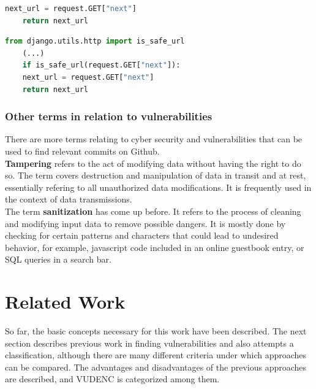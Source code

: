 \documentclass[
a4paper,
pagesize,
pdftex,
12pt,
twoside, %
BCOR=5mm, %
ngerman,
fleqn,
final,
]{scrartcl}
\begin{document}
	\begin{lstlisting}[language=Python, showstringspaces=False]
	next_url = request.GET["next"]
	return next_url
	\end{lstlisting}
	
	\begin{lstlisting}[language=Python, showstringspaces=False]
	from django.utils.http import is_safe_url
	(...)
	if is_safe_url(request.GET["next"]):
	next_url = request.GET["next"]
	return next_url
	\end{lstlisting}
	
	
	\subsubsection{Other terms in relation to vulnerabilities}
	There are more terms relating to cyber security and vulnerabilities that can be used to find relevant commits on Github.\\
	\textbf{Tampering} refers to the act of modifying data without having the right to do so. The term covers destruction and manipulation of data in transit and at rest, essentially refering to all unauthorized data modifications. It is frequently used in the context of data transmissions.\\
	The term \textbf{sanitization} has come up before. It refers to the process of cleaning and modifying input data to remove possible dangers. It is mostly done by checking for certain patterns and characters that could lead to undesired behavior, for example, javascript code included in an online guestbook entry, or SQL queries in a search bar.\\
	
	\newpage

	\section{Related Work}\label{Related-Work}
	
	So far, the basic concepts necessary for this work have been described. The next section describes previous work in finding vulnerabilities and also attempts a classification, although there are many different criteria under which approaches can be compared. The advantages and disadvantages of the previous approaches are described, and VUDENC is categorized among them.
	
\end{document}
